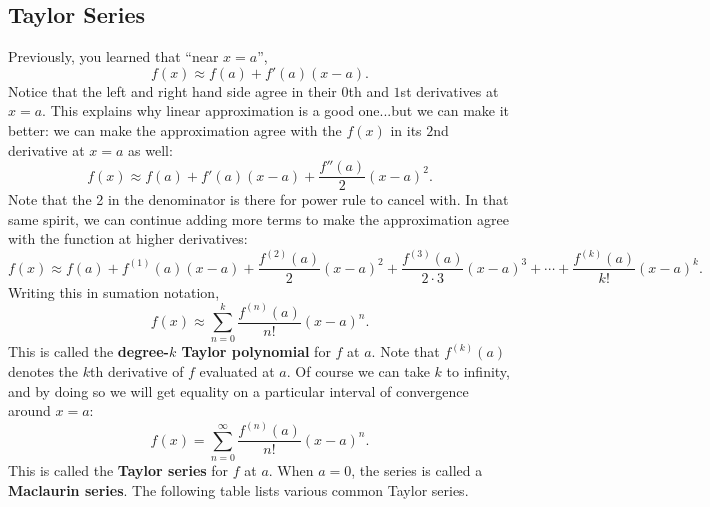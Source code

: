 \subsection{Taylor Series}

Previously, you learned that ``near $x=a$'',
$$f(x)\approx f(a)+f'(a)(x-a).$$
Notice that the left and right hand side agree in their $0$th and $1$st derivatives at $x=a$. This explains why linear approximation is a good one...but we can make it better: we can make the approximation agree with the $f(x)$ in its $2$nd derivative at $x=a$ as well:
$$f(x)\approx f(a)+f'(a)(x-a)+\frac{f''(a)}{2}(x-a)^2.$$
Note that the 2 in the denominator is there for power rule to cancel with. In that same spirit, we can continue adding more terms to make the approximation agree with the function at higher derivatives:
$$f(x) \approx f(a)+f^{(1)}(a)(x-a)+\frac{f^{(2)}(a)}{2}(x-a)^2+\frac{f^{(3)}(a)}{2\cdot 3}(x-a)^3+\cdots+\frac{f^{(k)}(a)}{k!}(x-a)^k.$$
Writing this in sumation notation,
$$f(x)\approx \sum_{n=0}^k\frac{f^{(n)}(a)}{n!}(x-a)^n.$$
This is called the \textbf{degree-$k$ Taylor polynomial} for $f$ at $a$. Note that $f^{(k)}(a)$ denotes the $k$th derivative of $f$ evaluated at $a$. Of course we can take $k$ to infinity, and by doing so we will get equality on a particular interval of convergence around $x=a$:
$$f(x)= \sum_{n=0}^\infty\frac{f^{(n)}(a)}{n!}(x-a)^n.$$
This is called the \textbf{Taylor series} for $f$ at $a$. When $a=0$, the series is called a \textbf{Maclaurin series}. The following table lists various common Taylor series.

